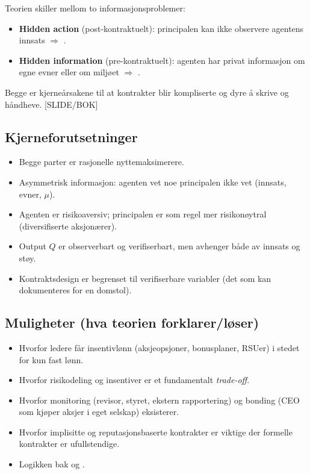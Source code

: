 Teorien skiller mellom to informasjonsproblemer:
\begin{itemize}
\item \textbf{Hidden action} (post-kontraktuelt): principalen kan ikke observere agentens innsats $\Rightarrow$ .
\item \textbf{Hidden information} (pre-kontraktuelt): agenten har privat informasjon om egne evner eller om miljøet $\Rightarrow$ .
\end{itemize}
Begge er kjerneårsakene til at kontrakter blir kompliserte og dyre å skrive og håndheve. [SLIDE/BOK]

\subsection*{Kjerneforutsetninger}
\begin{itemize}
\item Begge parter er rasjonelle nyttemaksimerere.
\item Asymmetrisk informasjon: agenten vet noe principalen ikke vet (innsats, evner, $\mu$).
\item Agenten er risikoaversiv; principalen er som regel mer risikonøytral (diversifiserte aksjonærer).
\item Output $Q$ er observerbart og verifiserbart, men avhenger både av innsats og støy.
\item Kontraktsdesign er begrenset til verifiserbare variabler (det som kan dokumenteres for en domstol).
\end{itemize}

\subsection*{Muligheter (hva teorien forklarer/løser)}
\begin{itemize}
\item Hvorfor ledere får insentivlønn (aksjeopsjoner, bonusplaner, RSUer) i stedet for kun fast lønn.
\item Hvorfor risikodeling og insentiver er et fundamentalt \emph{trade-off}.
\item Hvorfor monitoring (revisor, styret, ekstern rapportering) og bonding (CEO som kjøper aksjer i eget selskap) eksisterer.
\item Hvorfor implisitte og reputasjonsbaserte kontrakter er viktige der formelle kontrakter er ufullstendige.
\item Logikken bak  og .
\end{itemize}


